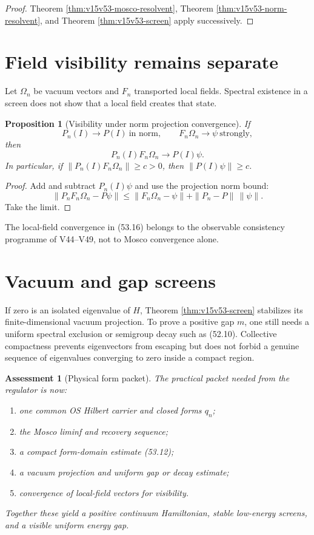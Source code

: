 \documentclass[11pt]{article}
\newtheorem{proposition}[theorem]{Proposition}
\newtheorem{assessment}[theorem]{Assessment}
\theoremstyle{remark}
\begin{document}
\begin{proof}
Theorem \ref{thm:v15v53-mosco-resolvent},
Theorem \ref{thm:v15v53-norm-resolvent}, and Theorem
\ref{thm:v15v53-screen} apply successively.
\end{proof}

\section{Field visibility remains separate}

Let \(\Omega_n\) be vacuum vectors and \(F_n\) transported local
fields.  Spectral existence in a screen does not show that a local
field creates that state.

\begin{proposition}[Visibility under norm projection convergence]
\label{prop:v15v53-visibility}
If
\[
 P_n(I)\to P(I)\ \text{in norm},\qquad
 F_n\Omega_n\to\psi\ \text{strongly},                  \tag{53.16}
\]
then
\[
 P_n(I)F_n\Omega_n\longrightarrow P(I)\psi.             \tag{53.17}
\]
In particular, if
\(\|P_n(I)F_n\Omega_n\|\geq c>0\), then
\(\|P(I)\psi\|\geq c\).
\end{proposition}

\begin{proof}
Add and subtract \(P_n(I)\psi\) and use the projection norm bound:
\[
 \|P_nF_n\Omega_n-P\psi\|
 \leq\|F_n\Omega_n-\psi\|+\|P_n-P\|\,\|\psi\|.
\]
Take the limit.
\end{proof}

The local-field convergence in (53.16) belongs to the observable
consistency programme of V44--V49, not to Mosco convergence alone.

\section{Vacuum and gap screens}

If zero is an isolated eigenvalue of \(H\), Theorem
\ref{thm:v15v53-screen} stabilizes its finite-dimensional vacuum
projection.  To prove a positive gap \(m\), one still needs a
uniform spectral exclusion or semigroup decay such as (52.10).
Collective compactness prevents eigenvectors from escaping but does
not forbid a genuine sequence of eigenvalues converging to zero
inside a compact region.

\begin{assessment}[Physical form packet]
\label{ass:v15v53-packet}
The practical packet needed from the regulator is now:
\begin{enumerate}
\item one common OS Hilbert carrier and closed forms \(q_n\);
\item the Mosco liminf and recovery sequence;
\item a compact form-domain estimate (53.12);
\item a vacuum projection and uniform gap or decay estimate;
\item convergence of local-field vectors for visibility.
\end{enumerate}
Together these yield a positive continuum Hamiltonian, stable
low-energy screens, and a visible uniform energy gap.
\end{assessment}
\end{document}
